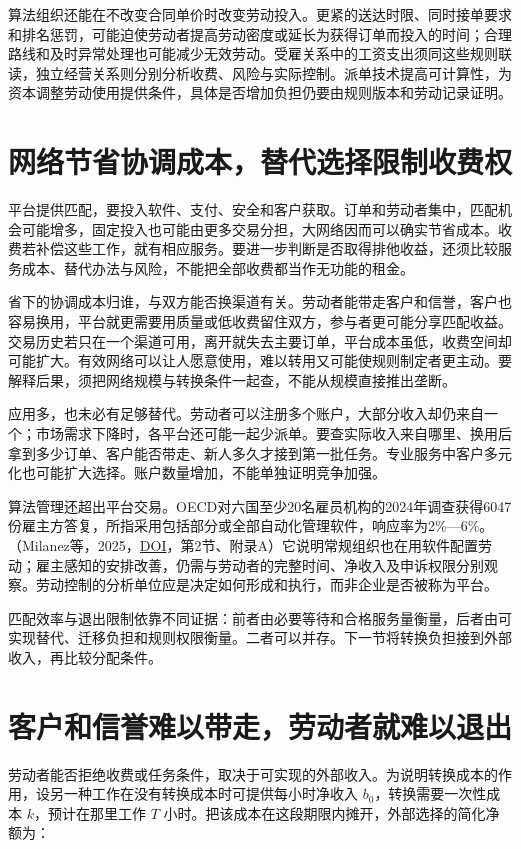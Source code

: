 \documentclass[UTF8,fontset=windows,12pt,a4paper,oneside,openany]{ctexbook}
\begin{document}
算法组织还能在不改变合同单价时改变劳动投入。更紧的送达时限、同时接单要求和排名惩罚，可能迫使劳动者提高劳动密度或延长为获得订单而投入的时间；合理路线和及时异常处理也可能减少无效劳动。受雇关系中的工资支出须同这些规则联读，独立经营关系则分别分析收费、风险与实际控制。派单技术提高可计算性，为资本调整劳动使用提供条件，具体是否增加负担仍要由规则版本和劳动记录证明。

\section{网络节省协调成本，替代选择限制收费权}

平台提供匹配，要投入软件、支付、安全和客户获取。订单和劳动者集中，匹配机会可能增多，固定投入也可能由更多交易分担，大网络因而可以确实节省成本。收费若补偿这些工作，就有相应服务。要进一步判断是否取得排他收益，还须比较服务成本、替代办法与风险，不能把全部收费都当作无功能的租金。

省下的协调成本归谁，与双方能否换渠道有关。劳动者能带走客户和信誉，客户也容易换用，平台就更需要用质量或低收费留住双方，参与者更可能分享匹配收益。交易历史若只在一个渠道可用，离开就失去主要订单，平台成本虽低，收费空间却可能扩大。有效网络可以让人愿意使用，难以转用又可能使规则制定者更主动。要解释后果，须把网络规模与转换条件一起查，不能从规模直接推出垄断。

应用多，也未必有足够替代。劳动者可以注册多个账户，大部分收入却仍来自一个；市场需求下降时，各平台还可能一起少派单。要查实际收入来自哪里、换用后拿到多少订单、客户能否带走、新人多久才接到第一批任务。专业服务中客户多元化也可能扩大选择。账户数量增加，不能单独证明竞争加强。

算法管理还超出平台交易。OECD对六国至少20名雇员机构的2024年调查获得6047份雇主方答复，所指采用包括部分或全部自动化管理软件，响应率为2\%—6\%。（Milanez等，2025，\href{https://doi.org/10.1787/287c13c4-en}{DOI}，第2节、附录A）它说明常规组织也在用软件配置劳动；雇主感知的安排改善，仍需与劳动者的完整时间、净收入及申诉权限分别观察。劳动控制的分析单位应是决定如何形成和执行，而非企业是否被称为平台。

匹配效率与退出限制依靠不同证据：前者由必要等待和合格服务量衡量，后者由可实现替代、迁移负担和规则权限衡量。二者可以并存。下一节将转换负担接到外部收入，再比较分配条件。

\section{客户和信誉难以带走，劳动者就难以退出}

劳动者能否拒绝收费或任务条件，取决于可实现的外部收入。为说明转换成本的作用，设另一种工作在没有转换成本时可提供每小时净收入 $b_0$，转换需要一次性成本 $k$，预计在那里工作 $T$ 小时。把该成本在这段期限内摊开，外部选择的简化净额为：
\end{document}
